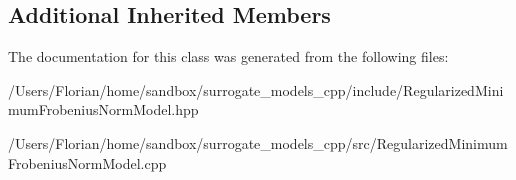 \subsection*{Additional Inherited Members}


The documentation for this class was generated from the following files\+:\begin{DoxyCompactItemize}
\item 
/\+Users/\+Florian/home/sandbox/surrogate\+\_\+models\+\_\+cpp/include/Regularized\+Minimum\+Frobenius\+Norm\+Model.\+hpp\item 
/\+Users/\+Florian/home/sandbox/surrogate\+\_\+models\+\_\+cpp/src/Regularized\+Minimum\+Frobenius\+Norm\+Model.\+cpp\end{DoxyCompactItemize}
